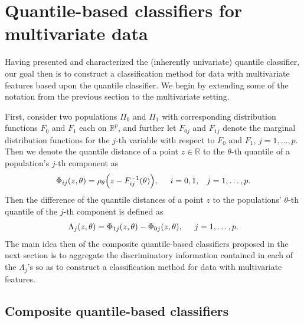 
\section{Quantile-based classifiers for multivariate data}
\label{sec:multivariate-classifier}

Having presented and characterized the (inherently univariate) quantile
classifier, our goal then is to construct a classification method for data with
multivariate features based upon the quantile classifier.  We begin by extending
some of the notation from the previous section to the multivariate setting.

First, consider two populations $\Pi_0$ and $\Pi_1$ with corresponding
distribution functions $F_0$ and $F_1$ each on $\mathbb{R}^{p}$, and further let
$F_{0j}$ and $F_{1j}$ denote the marginal distribution functions for the $j$-th
variable with respect to $F_0$ and $F_1$, $j = 1, \dots, p$.  Then we denote the
quantile distance of a point $z \in \mathbb{R}$ to the $\theta$-th quantile of a
population's $j$-th component as
\begin{equation}
  \label{eq:multivariate-phi}
  \Phi_{ij}(z, \theta) =
  \rho_{\theta}\Big(z - F_{ij}^{-1}(\theta) \Big),
  \hspace{5mm} i = 0, 1, \hspace{3mm} j = 1, \dots, p.
\end{equation}
Then the difference of the quantile distances of a point $z$ to the populations'
$\theta$-th quantile of the $j$-th component is defined as
\begin{equation}
  \Lambda_j (z, \theta) = \Phi_{1j}(z, \theta) - \Phi_{0j}(z, \theta),
  \hspace{5mm} j = 1, \dots, p.
\end{equation}
The main idea then of the composite quantile-based classifiers proposed in the
next section is to aggregate the discriminatory information contained in each of
the $\Lambda_j$'s so as to construct a classification method for data with
multivariate features.

\subsection{Composite quantile-based classifiers}
\label{sec:varying-coefficient}

